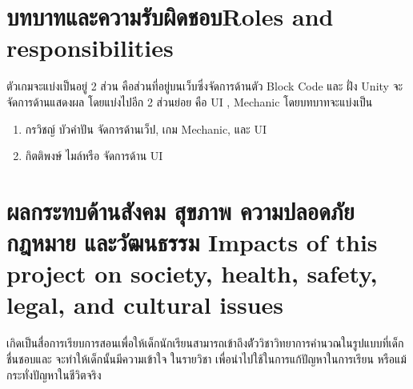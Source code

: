 \section{\ifcpe บทบาทและความรับผิดชอบ\else Roles and responsibilities\fi}
ตัวเกมจะแบ่งเป็นอยู่ 2 ส่วน คือส่วนที่อยู่บนเว็บซึ่งจัดการด้านตัว Block Code และ ฝั่ง Unity จะจัดการด้านแสดงผล โดยแบ่งไปอีก
2 ส่วนย่อย คือ UI , Mechanic โดยบทบาทจะแบ่งเป็น
\begin{enumerate}
    \item กรวิชญ์ บัวคำปัน จัดการด้านเว็ป, เกม Mechanic, และ UI
    \item กิตติพงษ์ ไมล์หรือ จัดการด้าน UI
\end{enumerate}

\section{\ifcpe%
ผลกระทบด้านสังคม สุขภาพ ความปลอดภัย กฎหมาย และวัฒนธรรม
\else%
Impacts of this project on society, health, safety, legal, and cultural issues
\fi}

เกิดเป็นสื่อการเรียบการสอนเพื่อให้เด็กนักเรียนสามารถเข้าถึงตััววิชาวิทยาการคำนวณในรูปแบบที่เด็กชื่นชอบและ จะทำให้เด็กนั้นมีความเข้าใจ
ในรายวิชา เพื่อนำไปใช้ในการแก้ปัญหาในการเรียน หรือแม้กระทั่งปัญหาในชีวิตจริง